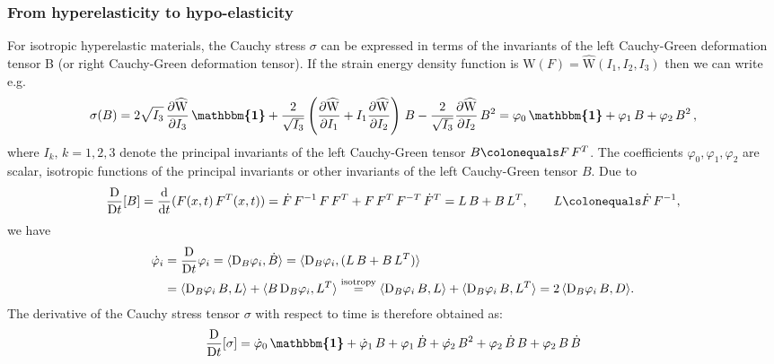 \documentclass[10pt]{article}
\numberwithin{theoremCounter}{section}
\theoremstyle{plain}
\theoremstyle{definition}
\newcommand{\id}{{\boldsymbol{\mathbbm{1}}}}
\newcommand{\DD}{\mathrm{D}}
\newcommand{\WW}{\mathrm{W}}
\newcommand*\dif{\mathop{}\!\mathrm{d}}
\numberwithin{equation}{section}
\begin{document}
\begin{appendix}
\subsubsection{From hyperelasticity to hypo-elasticity}
%
For isotropic hyperelastic materials, the Cauchy stress $\sigma$ can be expressed in terms of the invariants of the left Cauchy-Green deformation tensor B (or right Cauchy-Green deformation tensor). If the strain energy density function is $\WW(F) = \widehat{\WW}(I_1,I_2,I_3)$ then we can write e.g.
	\begin{align}
	\sigma(B) = 2 \sqrt{I_3} \, \frac{\partial \widehat{\WW}}{\partial I_3} \, \id + \frac{2}{\sqrt{I_3}} \left(\frac{\partial \widehat{\WW}}{\partial I_1} + I_1 \frac{\partial \widehat{\WW}}{\partial I_2}\right) \, B - \frac{2}{\sqrt{I_3}} \frac{\partial \widehat{\WW}}{\partial I_2} \, B^2 = \varphi_0 \, \id + \varphi_1 \, B + \varphi_2 \, B^2 \, ,
	\end{align}
where $I_k, \, k = 1,2,3$ denote the principal invariants of the left Cauchy-Green tensor $B\colonequals F \, F^T$. The coefficients $\varphi_0, \varphi_1, \varphi_2$ are scalar, isotropic functions of the principal invariants or other invariants of the left Cauchy-Green tensor $B$. Due to
	\begin{align}
	\frac{\DD}{\DD t}[B] = \frac{\dif}{\dif t}(F(x,t) \, F^T(x,t)) = \dot{F} \, F^{-1} \, F \, F^T + F \, F^T \, F^{-T} \, \dot{F}^T = L \, B + B \, L^T, \qquad L\colonequals \dot{F} \, F^{-1},
	\end{align}
we have
	\begin{equation}
	\begin{alignedat}{2}
	\dot{\varphi}_i &= \frac{\DD}{\DD t} \varphi_i = \langle \DD_B \varphi_i, \dot{B} \rangle = \langle \DD_B \varphi_i, (L\, B + B \, L^T) \rangle \\
	&= \langle \DD_B \varphi_i \, B, L \rangle + \langle B \, \DD_B \varphi_i, L^T \rangle \overset{\textnormal{isotropy}}{=} \langle \DD_B \varphi_i \, B, L \rangle + \langle \DD_B \varphi_i \, B, L^T \rangle = 2 \, \langle \DD_B \varphi_i \, B, D \rangle.
	\end{alignedat}
	\end{equation}
The derivative of the Cauchy stress tensor $\sigma$ with respect to time is therefore obtained as:
	\begin{equation}
	\begin{alignedat}{2}
	\frac{\DD}{\DD t} [\sigma] &= \dot{\varphi}_0 \, \id + \dot{\varphi}_1 \, B + \varphi_1 \, \dot{B} + \dot{\varphi_2} \, B^2 + \varphi_2 \, \dot{B} \, B + \varphi_2 \, B \, \dot{B} \\

\end{alignedat}
\end{equation}
\end{appendix}
\end{document}

